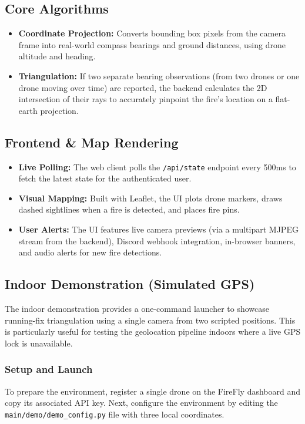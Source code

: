 \documentclass[journal, onecolumn]{IEEEtran}
\begin{document}
\subsection{Core Algorithms}
\begin{itemize}
    \item \textbf{Coordinate Projection:} Converts bounding box pixels from the camera frame into real-world compass bearings and ground distances, using drone altitude and heading.
    \item \textbf{Triangulation:} If two separate bearing observations (from two drones or one drone moving over time) are reported, the backend calculates the 2D intersection of their rays to accurately pinpoint the fire's location on a flat-earth projection.
\end{itemize}

\subsection{Frontend \& Map Rendering}
\begin{itemize}
    \item \textbf{Live Polling:} The web client polls the \texttt{/api/state} endpoint every 500ms to fetch the latest state for the authenticated user.
    \item \textbf{Visual Mapping:} Built with Leaflet, the UI plots drone markers, draws dashed sightlines when a fire is detected, and places fire pins.
    \item \textbf{User Alerts:} The UI features live camera previews (via a multipart MJPEG stream from the backend), Discord webhook integration, in-browser banners, and audio alerts for new fire detections.
\end{itemize}

\subsection{Indoor Demonstration (Simulated GPS)}
The indoor demonstration provides a one-command launcher to showcase running-fix triangulation using a single camera from two scripted positions. This is particularly useful for testing the geolocation pipeline indoors where a live GPS lock is unavailable.

\subsubsection{Setup and Launch}
To prepare the environment, register a single drone on the FireFly dashboard and copy its associated API key. Next, configure the environment by editing the \texttt{main/demo/demo\_config.py} file with three local coordinates.
\end{document}

